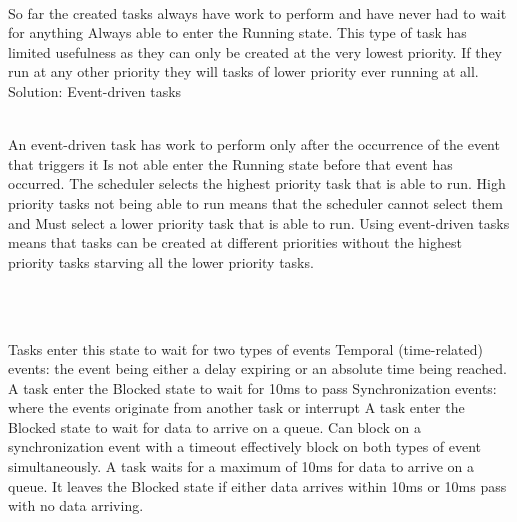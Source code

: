 \begin{description}
\os{\newpage}



\item[{\rot\bf ‘Continuous processing’ task}]~\\[-3ex]
\bi
\ite So far the created tasks always have work to perform and have never had to wait for anything
\bi
\ite Always able to enter the Running state.
\ei
\ite This type of task has limited usefulness as they can only be created at the very lowest priority.
\bi
\ite If they run at any other priority they will tasks of lower priority  ever running at all.
\ei
\ite Solution: Event-driven tasks
\ei

\os{\newpage}



\item[{\rot\bf Expanding the ‘Not Running’ state}]~\\[-3ex]
\bi
\ite An event-driven task
\bi
\ite has work to perform only after the occurrence of the event that triggers it
\ite Is not able enter the Running state before that event has occurred.
\ei
\ite The scheduler selects the highest priority task that is able to run.
\bi
\ite High priority tasks not being able to run means that the scheduler cannot select them and
\ite Must select a lower priority task that is able to run.
\ei
\ite Using event-driven tasks means that
\bi
\ite tasks can be created at different priorities without the highest priority tasks starving all the lower priority tasks.
\ei
\ei

\os{\newpage}



\item[{\rot\bf Full task state machine}]~\\[-3ex]

\os{\newpage}



\item[{\rot\bf Blocked state }]~\\[-3ex]
\bi
\ite Tasks enter this state to wait for two types of events
\bi
\ite Temporal (time-related) events: the event being either a delay expiring or an absolute time being reached.
\bi
\ite A task enter the Blocked state to wait for 10ms to pass
\ei
\ite Synchronization events: where the events originate from another task or interrupt
\bi
\ite A task enter the Blocked state to wait for data to arrive on a queue.
\ei
\ite Can block on a synchronization event with a timeout effectively block on both types of event simultaneously.
\bi
\ite A task waits for a maximum of 10ms for data to arrive on a queue. It leaves the Blocked state if either data arrives within 10ms or 10ms pass with no data arriving.
\ei
\ei
\ei


\end{description}
